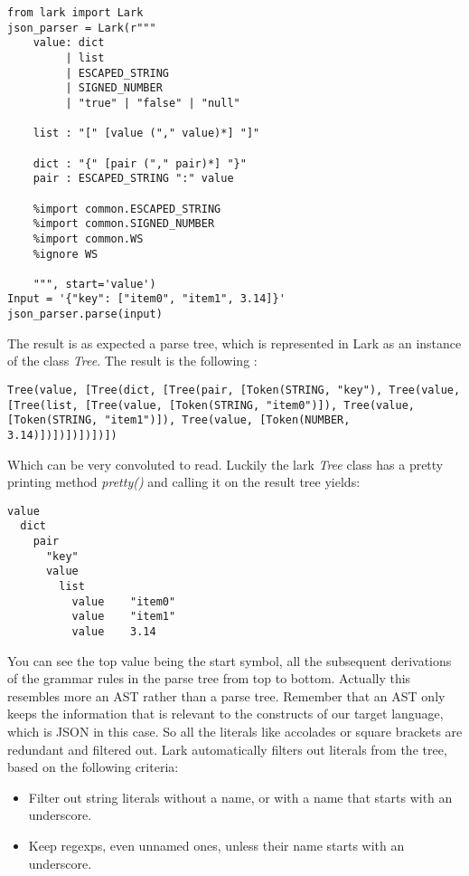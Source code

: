\documentclass[12pt]{article}
\begin{document}
\begin{lstlisting}
from lark import Lark
json_parser = Lark(r"""
    value: dict
         | list
         | ESCAPED_STRING
         | SIGNED_NUMBER
         | "true" | "false" | "null"

    list : "[" [value ("," value)*] "]"

    dict : "{" [pair ("," pair)*] "}"
    pair : ESCAPED_STRING ":" value

    %import common.ESCAPED_STRING
    %import common.SIGNED_NUMBER
    %import common.WS
    %ignore WS

    """, start='value')
Input = '{"key": ["item0", "item1", 3.14]}'
json_parser.parse(input)
\end{lstlisting}

The result is as expected a parse tree, which is represented in Lark as an instance of the class \emph{Tree}. The result is the following :

\begin{lstlisting}
Tree(value, [Tree(dict, [Tree(pair, [Token(STRING, "key"), Tree(value, [Tree(list, [Tree(value, [Token(STRING, "item0")]), Tree(value, [Token(STRING, "item1")]), Tree(value, [Token(NUMBER, 3.14)])])])])])])
\end{lstlisting}

Which can be very convoluted to read. Luckily the lark \emph{Tree} class has a pretty printing method \emph{pretty()} and calling it on the result tree yields:

\begin{lstlisting}
value
  dict
    pair
      "key"
      value
        list
          value    "item0"
          value    "item1"
          value    3.14

\end{lstlisting}

You can see the top value being the start symbol, all the subsequent derivations of the grammar rules in the parse tree from top to bottom. Actually this resembles more an AST rather than a parse tree. Remember that an AST only keeps the information that is relevant to the constructs of our target language, which is JSON in this case. So all the literals like accolades or square brackets are redundant and filtered out. Lark automatically filters out literals from the tree, based on the following criteria:
\begin{itemize}
    \item Filter out string literals without a name, or with a name that starts with an underscore.
    \item Keep regexps, even unnamed ones, unless their name starts with an underscore.
\end{itemize}
\end{document}
